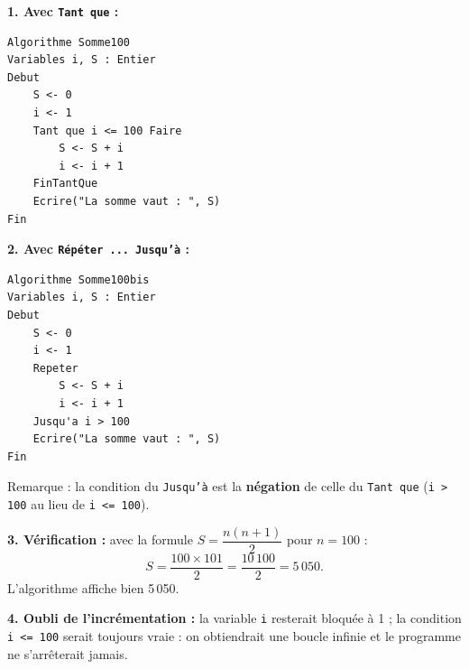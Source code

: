 \documentclass[11pt]{article}
\newcommand{\cle}[1]{{\popxbold\color{popdark}#1}}
\begin{document}
\begin{corrige}
\textbf{1. Avec \texttt{Tant que} :}
\begin{lstlisting}
Algorithme Somme100
Variables i, S : Entier
Debut
    S <- 0
    i <- 1
    Tant que i <= 100 Faire
        S <- S + i
        i <- i + 1
    FinTantQue
    Ecrire("La somme vaut : ", S)
Fin
\end{lstlisting}

\textbf{2. Avec \texttt{Répéter ... Jusqu'à} :}
\begin{lstlisting}
Algorithme Somme100bis
Variables i, S : Entier
Debut
    S <- 0
    i <- 1
    Repeter
        S <- S + i
        i <- i + 1
    Jusqu'a i > 100
    Ecrire("La somme vaut : ", S)
Fin
\end{lstlisting}
Remarque : la condition du \texttt{Jusqu'à} est la \textbf{négation} de celle du \texttt{Tant que} (\texttt{i > 100} au lieu de \texttt{i <= 100}).

\textbf{3. Vérification :} avec la formule $S = \dfrac{n(n+1)}{2}$ pour $n = 100$ :
\[ S = \frac{100 \times 101}{2} = \frac{10\,100}{2} = 5\,050. \]
L'algorithme affiche bien 5\,050.

\textbf{4. Oubli de l'incrémentation :} la variable \texttt{i} resterait bloquée à 1 ; la condition \texttt{i <= 100} serait toujours vraie : on obtiendrait une \cle{boucle infinie} et le programme ne s'arrêterait jamais.
\end{corrige}
\end{document}
